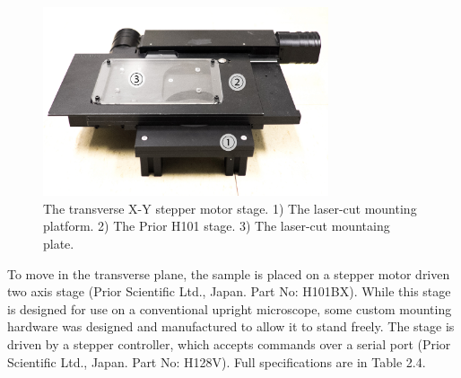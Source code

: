 \begin{figure}[h!]
\centering
\includegraphics[width=0.75\textwidth]{Images/Photographs/DSCF1722_an.jpg}
\caption[The transverse X-Y stepper motor stage.]{The transverse X-Y stepper motor stage. 1) The laser-cut mounting platform. 2) The Prior H101 stage. 3) The laser-cut mountaing plate.}
\end{figure}

To move in the transverse plane, the sample is placed on a stepper motor driven two axis stage (Prior Scientific Ltd., Japan. Part No: H101BX). While this stage is designed for use on a conventional upright microscope, some custom mounting hardware was designed and manufactured to allow it to stand freely. The stage is driven by a stepper controller, which accepts commands over a serial port (Prior Scientific Ltd., Japan. Part No: H128V). Full specifications are in Table 2.4.




